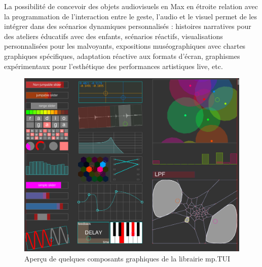La possibilité de concevoir des objets audiovisuels en Max en étroite relation avec la programmation de l'interaction entre le geste, l'audio et le visuel permet de les intégrer dans des scénarios dynamiques personnalisés : histoires narratives pour des ateliers éducatifs avec des enfants, scénarios réactifs, visualisations personnalisées pour les malvoyants, expositions muséographiques avec chartes graphiques spécifiques, adaptation réactive aux formats d'écran, graphismes expérimentaux pour l'esthétique des performances artistiques live, etc.

\begin{figure}[htb]
	\includegraphics[width=\textwidth]{gfx/mpTUI/mp-TUI-preview.png}
	\caption{Aperçu de quelques composants graphiques de la librairie mp.TUI}
	\label{fig:visual_representation:mp.TUI}
\end{figure}

